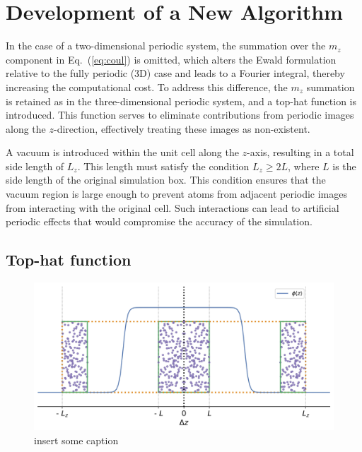 
\chapter{Development of a New Algorithm}

\label{Chapter4}

In the case of a two-dimensional periodic system, the summation over the $m_z$ component in Eq.~(\ref{eq:coul}) is omitted, which alters the Ewald formulation relative to the fully periodic (3D) case and leads to a Fourier integral, thereby increasing the computational cost. To address this difference, the $m_z$ summation is retained as in the three-dimensional periodic system, and a top-hat function is introduced. This function serves to eliminate contributions from periodic images along the $z$-direction, effectively treating these images as non-existent.

A vacuum is introduced within the unit cell along the $z$-axis, resulting in a total side length of $ L_z$. This length must satisfy the condition $L_z \geq 2L$, where $L$ is the side length of the original simulation box. This condition ensures that the vacuum region is large enough to prevent atoms from adjacent periodic images from interacting with the original cell. Such interactions can lead to artificial periodic effects that would compromise the accuracy of the simulation.
\section{Top-hat function}
\begin{figure}[]%
    \centering
    \includegraphics[width=\linewidth]{images/simulationcell.jpg}
    \caption{insert some caption}
    \label{fig:simulation_cell}
\end{figure}

